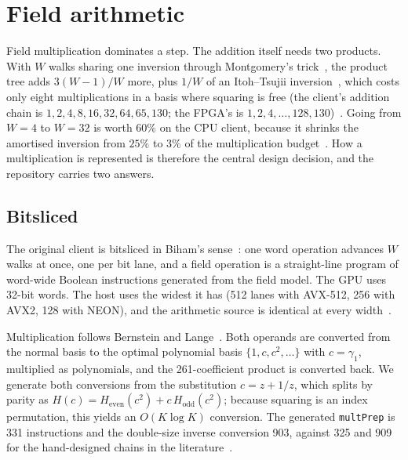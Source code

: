 \section{Field arithmetic}
\label{sec:arith}

Field multiplication dominates a step. The addition itself needs two
products. With $W$ walks sharing one inversion through Montgomery's
trick~\cite{montgomery1987}, the product tree adds $3(W-1)/W$ more,
plus $1/W$ of an Itoh--Tsujii inversion~\cite{itoh1988}, which costs
only eight multiplications in a basis where squaring is free (the
client's addition chain is $1,2,4,8,16,32,64,65,130$; the FPGA's is
$1,2,4,\ldots,128,130$)~.
Going from $W=4$ to $W=32$ is worth $60\%$ on the CPU client, because
it shrinks the amortised inversion from $25\%$ to $3\%$ of the
multiplication budget~. How a
multiplication is represented is therefore the central design
decision, and the repository carries two answers.

\subsection{Bitsliced}
\label{sec:arith-bitsliced}

The original client is bitsliced in Biham's sense~\cite{biham1997}:
one word operation advances $W$ walks at once, one per bit lane, and a
field operation is a straight-line program of word-wide Boolean
instructions generated from the field model. The GPU uses 32-bit
words. The host uses the widest it has (512 lanes with AVX-512, 256
with AVX2, 128 with NEON), and the arithmetic source is identical at
every width~.

Multiplication follows Bernstein and Lange~\cite{bernsteinlange2010onb}.
Both operands are converted from the normal basis to the optimal
polynomial basis $\{1,c,c^2,\ldots\}$ with $c=\gamma_1$, multiplied as
polynomials, and the 261-coefficient product is converted back. We
generate both conversions from the substitution $c=z+1/z$, which
splits by parity as
$H(c)=H_{\mathrm{even}}(c^2)+c\,H_{\mathrm{odd}}(c^2)$; because squaring
is an index permutation, this yields an $O(K\log K)$ conversion. The
generated \texttt{multPrep} is 331 instructions and the double-size
inverse conversion 903, against 325 and 909 for the hand-designed
chains in the literature~.

